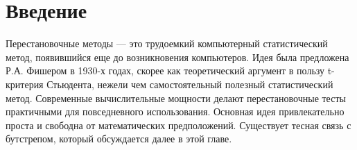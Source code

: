 \section{Введение}

Перестановочные методы --- это трудоемкий компьютерный статистический метод, появившийся еще до возникновения компьютеров. Идея была предложена Р.А. Фишером в 1930-х годах, скорее как теоретический аргумент в пользу t-критерия Стьюдента, нежели чем самостоятельный полезный статистический метод. Современные вычислительные мощности делают перестановочные тесты практичными для повседневного использования. Основная идея привлекательно проста и свободна от математических предположений. Существует тесная связь с бутстрепом, который обсуждается далее в этой главе.